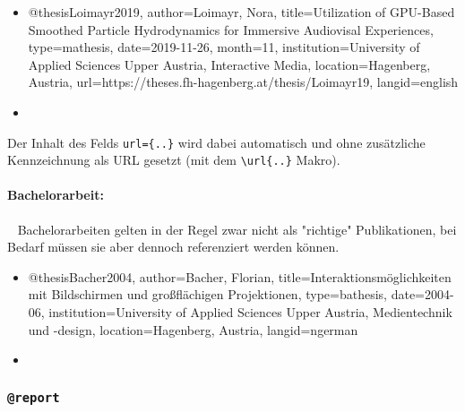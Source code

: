 %
\begin{itemize}
\item[]
\begin{GenericCode}[numbers=none]
@thesis{Loimayr2019,
  author={Loimayr, Nora},
  title={Utilization of GPU-Based Smoothed Particle Hydrodynamics for Immersive Audiovisal Experiences},
  type={mathesis},
  date={2019-11-26},
  month={11},
  institution={University of Applied Sciences Upper Austria, Interactive Media},
  location={Hagenberg, Austria},
  url={https://theses.fh-hagenberg.at/thesis/Loimayr19},
  langid={english}
}
\end{GenericCode}
\item[\cite{Loimayr2019}] 
\end{itemize}
%
Der Inhalt des Felds \verb!url={..}! wird dabei automatisch und ohne zusätzliche Kennzeichnung als URL gesetzt (mit
dem \verb!\url{..}! Makro).


\paragraph{Bachelorarbeit:} ~ \newline
Bachelorarbeiten gelten in der Regel zwar nicht als "richtige" Publikationen, bei Bedarf müssen sie aber dennoch
referenziert werden können.
%
\begin{itemize}
\item[]
\begin{GenericCode}[numbers=none]
@thesis{Bacher2004,
  author={Bacher, Florian},
  title={Interaktionsmöglichkeiten mit Bildschirmen und großflächigen Projektionen},
  type={bathesis},
  date={2004-06},
  institution={University of Applied Sciences Upper Austria, Medientechnik und {-design}},
  location={Hagenberg, Austria},
  langid={ngerman}
}
\end{GenericCode}
\item[\cite{Bacher2004}] 
\end{itemize}


\subsubsection{\texttt{\bfseries @report}}
\label{sec:@report}

